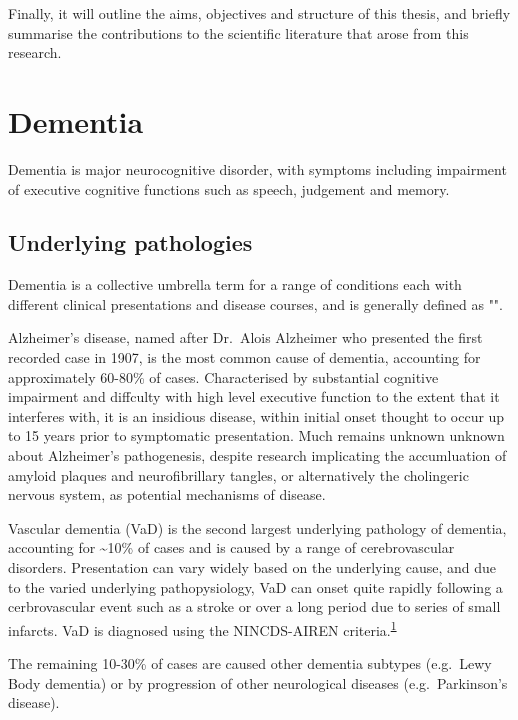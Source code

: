 \documentclass[a4paper, twoside]{templates/ociamthesis}
\begin{document}
Finally, it will outline the aims, objectives and structure of this thesis, and briefly summarise the contributions to the scientific literature that arose from this research.

\hypertarget{dementia}{%
\section{Dementia}\label{dementia}}

Dementia is major neurocognitive disorder, with symptoms including impairment of executive cognitive functions such as speech, judgement and memory.

\hypertarget{underlying-pathologies}{%
\subsection{Underlying pathologies}\label{underlying-pathologies}}

Dementia is a collective umbrella term for a range of conditions each with different clinical presentations and disease courses, and is generally defined as "".

Alzheimer's disease, named after Dr.~Alois Alzheimer who presented the first recorded case in 1907, is the most common cause of dementia, accounting for approximately 60-80\% of cases. Characterised by substantial cognitive impairment and diffculty with high level executive function to the extent that it interferes with, it is an insidious disease, within initial onset thought to occur up to 15 years prior to symptomatic presentation. Much remains unknown unknown about Alzheimer's pathogenesis, despite research implicating the accumluation of amyloid plaques and neurofibrillary tangles, or alternatively the cholingeric nervous system, as potential mechanisms of disease.

Vascular dementia (VaD) is the second largest underlying pathology of dementia, accounting for \textasciitilde10\% of cases and is caused by a range of cerebrovascular disorders. Presentation can vary widely based on the underlying cause, and due to the varied underlying pathopysiology, VaD can onset quite rapidly following a cerbrovascular event such as a stroke or over a long period due to series of small infarcts. VaD is diagnosed using the NINCDS-AIREN criteria.\textsuperscript{\protect\hyperlink{ref-roman1993vascular}{1}}

The remaining 10-30\% of cases are caused other dementia subtypes (e.g.~Lewy Body dementia) or by progression of other neurological diseases (e.g.~Parkinson's disease).
\end{document}
